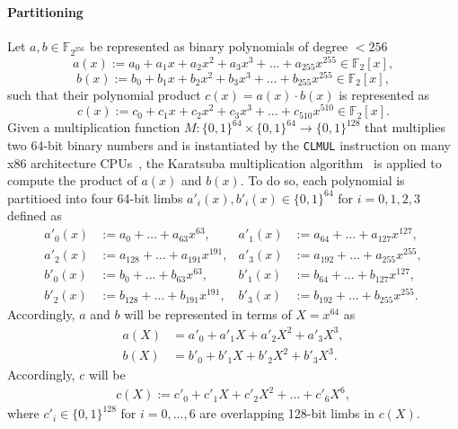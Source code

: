 \paragraph{Partitioning}
Let $a,b \in \mathbb{F}_{2^{256}}$ be represented as  binary polynomials of degree $<256$
\[
	a(x) := a_0 + a_1x + a_2x^2 + a_3x^3 + \dots + a_{255}x^{255} \in \mathbb{F}_{2}[x], 
\]
\[
	b(x) := b_0 + b_1x + b_2x^2 + b_3x^3 + \dots + b_{255}x^{255} \in \mathbb{F}_{2}[x],
\]
such that their polynomial product  $c(x) = a(x) \cdot b(x)$ is represented as
\[
c(x) := c_0 + c_1x + c_2x^2 + c_3x^3 + \dots + c_{510}x^{510} \in \mathbb{F}_{2}[x].
\]
Given a multiplication function $M:\{0,1\}^{64}\times\{0,1\}^{64} \rightarrow \{0,1\}^{128}$ that multiplies two 64-bit binary numbers and is instantiated by the \texttt{CLMUL} instruction on many x86 architecture CPUs~\cite{gueron2010intel}, the Karatsuba multiplication algorithm~\cite{karatsuba1962multiplication} is applied to compute the product of  $a(x)$ and $b(x)$.  To do so, each polynomial is partitioed into four 64-bit limbs \mbox{\(a'_i(x), b'_i(x)\in\{0,1\}^{64}\)} for $i=0,1,2,3$ defined as 
\begin{align*}
	a'_0 (x) &:= a_0 + \dots + a_{63}x^{63}, & 					a'_1 (x) &:= a_{64} +  \dots + a_{127}x^{127}, \\
	a'_2 (x) &:= a_{128} + \dots + a_{191}x^{191}, & 	  a'_3 (x) &:= a_{192} +  \dots + a_{255}x^{255},\\
	b'_0 (x) &:= b_0 + \dots + b_{63}x^{63}, & 				   b'_1 (x) &:= b_{64} +  \dots + b_{127}x^{127}, \\
	b'_2 (x) &:= b_{128} + \dots + b_{191}x^{191}, &	 b'_3 (x) &:= b_{192} +  \dots + b_{255}x^{255}.
\end{align*}
Accordingly, $a $ and $b$ will be represented in terms of $X = x^{64}$ as
\begin{align*}
	a(X)  &= a'_0 + a'_1X + a'_2X^2 + a'_3X^3,\\
	b(X)  &= b'_0 + b'_1X + b'_2X^2 + b'_3X^3.
\end{align*}
Accordingly,  $c$  will be
\begin{align}\label{eq:c_X}
	c(X) := c'_0 + c'_1X + c'_2X^2 +  \dots + c'_{6}X^{6},
\end{align}
where $c'_i \in \{0,1\}^{128}$ for $i=0, \dots, 6$ are overlapping 128-bit limbs in $c(X)$. 

